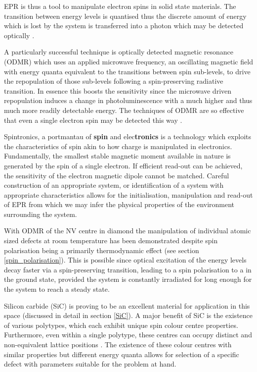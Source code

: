 EPR is thus a tool to manipulate electron spins in solid state materials. The transition between energy levels is quantised thus the discrete amount of energy which is lost by the system is transferred into a photon which may be detected optically \cite{carrington1967introduction}.

A particularly successful technique is optically detected magnetic resonance (ODMR) which uses an applied microwave frequency, an oscillating magnetic field with energy quanta equivalent to the transitions between spin sub-levels, to drive the repopulation of those sub-levels following a spin-preserving radiative transition.
In essence this boosts the sensitivity since the microwave driven repopulation induces a change in photoluminescence with a much higher and thus much more readily detectable energy. The techniques of ODMR are so effective that even a single electron spin may be detected this way \cite{Khler1993}.

Spintronics, a portmantau of \textbf{spin} and elec\textbf{tronics} is a technology which exploits the characteristics of spin akin to how charge is manipulated in electronics. Fundamentally, the smallest stable magnetic moment available in nature is generated by the spin of a single electron. If efficient read-out can be achieved, the sensitivity of the electron magnetic dipole cannot be matched. 
Careful construction of an appropriate system, or identification of a system with appropriate characteristics allows for the initialisation, manipulation and read-out of EPR from which we may infer the physical properties of the environment surrounding the system. 

With ODMR of the NV centre in diamond the manipulation of individual atomic sized defects at room temperature has been demonstrated \cite{Levine} despite spin polarisation being a primarily thermodynamic effect (see section \ref{spin_polarisation}).
This is possible since optical excitation of the energy levels decay faster via a spin-preserving transition, leading to a spin polarisation to a in the ground state, provided the system is constantly irradiated for long enough for the system to reach a steady state.

Silicon carbide (SiC) is proving to be an excellent material for application in this space (discussed in detail in section \ref{SiC}). A major benefit of SiC is the existence of various polytypes, which each exhibit unique spin colour centre properties. Furthermore, even within a single polytype, these centres can occupy distinct and non-equivalent lattice positions \cite{Kimoto2014}.
The existence of these colour centres with similar properties but different energy quanta allows for selection of a specific defect with parameters suitable for the problem at hand. 

